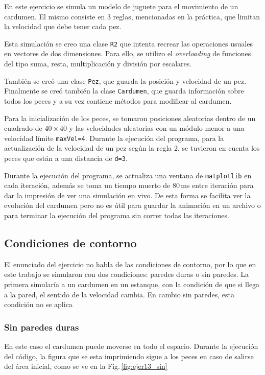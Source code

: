En este ejercicio se simula un modelo de juguete para el movimiento de un cardumen. El mismo consiste en 3 reglas, mencionadas en la práctica,  que limitan la velocidad que debe tener cada pez.

Esta simulación se creo una clase \verb|R2| que intenta recrear las operaciones usuales en vectores de dos dimensiones. Para ello, se utilizo el \emph{overloading} de funciones del tipo suma, resta, multiplicación y división por escalares.

También se creó una clase \verb|Pez|, que guarda la posición y velocidad  de un pez. Finalmente se creó también la clase \verb|Cardumen|, que guarda información sobre todos los peces y a su vez contiene métodos para modificar al cardumen.

Para la inicialización de los peces, se tomaron posiciones aleatorias dentro de un cuadrado de $40\times40$ y las velocidades aleatorias con un módulo menor a una velocidad límite \verb|maxVel=4|. Durante la ejecución del programa, para la actualización de la velocidad de un pez según la regla 2, se tuvieron en cuenta los peces que están a una distancia de \verb|d=3|.


Durante la ejecución del programa, se actualiza una ventana de \verb|matplotlib| en cada iteración, además se toma un tiempo muerto de $80\,$ms entre iteración para dar la impresión de ver  una simulación en vivo. De esta forma se facilita ver  la evolución del cardumen pero no es útil para guardar la animación en un archivo o para terminar la ejecución del programa sin correr todas las iteraciones.

\subsection*{Condiciones de contorno}

El enunciado del ejercicio no habla de las condiciones de contorno, por lo que en este  trabajo se simularon con  dos condiciones: paredes duras o sin paredes. La primera simularía a  un cardumen en un estanque, con la condición de que si llega a la pared, el sentido de la velocidad cambia. En cambio sin paredes, esta condición no se aplica

\subsubsection*{Sin paredes duras}

En este caso el cardumen puede moverse en todo el espacio. Durante la ejecución del código, la figura  que se esta imprimiendo sigue a los peces en caso de salirse del área inicial, como se ve en la Fig.\,\ref{fig:ejer13_sin}

